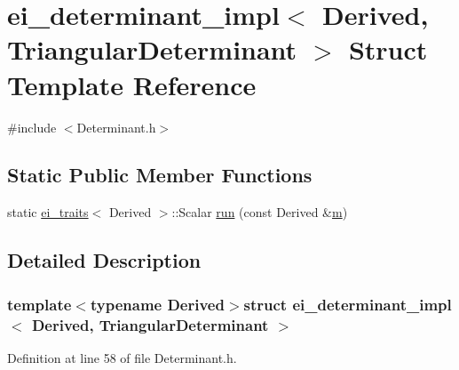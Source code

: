 \hypertarget{structei__determinant__impl_3_01_derived_00_01_triangular_determinant_01_4}{\section{ei\-\_\-determinant\-\_\-impl$<$ Derived, Triangular\-Determinant $>$ Struct Template Reference}
\label{structei__determinant__impl_3_01_derived_00_01_triangular_determinant_01_4}
}


{\ttfamily \#include $<$Determinant.\-h$>$}

\subsection*{Static Public Member Functions}
\begin{DoxyCompactItemize}
\item 
static \hyperlink{structei__traits}{ei\-\_\-traits}$<$ Derived $>$\-::Scalar \hyperlink{structei__determinant__impl_3_01_derived_00_01_triangular_determinant_01_4_a12ce2da0943d2ba606f5debf6a33c215}{run} (const Derived \&\hyperlink{glext_8h_af593500c283bf1a787a6f947f503a5c2}{m})
\end{DoxyCompactItemize}


\subsection{Detailed Description}
\subsubsection*{template$<$typename Derived$>$struct ei\-\_\-determinant\-\_\-impl$<$ Derived, Triangular\-Determinant $>$}



Definition at line 58 of file Determinant.\-h.



